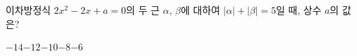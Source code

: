 이차방정식 $2x^2-2x+a=0$의 두 근 $\alpha$, $\beta$에 대하여 $|\alpha|+|\beta|=5$일 때, 상수 $a$의 값은?
\begin{choices32}{$-14$}{$-12$}{$-10$}{$-8$}{$-6$}\end{choices32}
